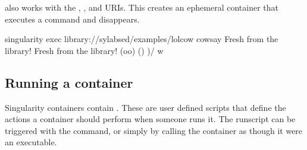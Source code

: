 \documentclass[letterpaper,10pt,english]{sphinxmanual}
\begin{document}
 also works with the , , and 
URIs. This creates an ephemeral container that executes a command and
disappears.

%
\begin{sphinxVerbatim}[commandchars=\\\{\}]
\PYGZdl{} singularity exec library://sylabsed/examples/lolcow cowsay \PYGZdq{}Fresh from the library!\PYGZdq{}
 \PYGZus{}\PYGZus{}\PYGZus{}\PYGZus{}\PYGZus{}\PYGZus{}\PYGZus{}\PYGZus{}\PYGZus{}\PYGZus{}\PYGZus{}\PYGZus{}\PYGZus{}\PYGZus{}\PYGZus{}\PYGZus{}\PYGZus{}\PYGZus{}\PYGZus{}\PYGZus{}\PYGZus{}\PYGZus{}\PYGZus{}\PYGZus{}\PYGZus{}
\PYGZlt{} Fresh from the library! \PYGZgt{}
 \PYGZhy{}\PYGZhy{}\PYGZhy{}\PYGZhy{}\PYGZhy{}\PYGZhy{}\PYGZhy{}\PYGZhy{}\PYGZhy{}\PYGZhy{}\PYGZhy{}\PYGZhy{}\PYGZhy{}\PYGZhy{}\PYGZhy{}\PYGZhy{}\PYGZhy{}\PYGZhy{}\PYGZhy{}\PYGZhy{}\PYGZhy{}\PYGZhy{}\PYGZhy{}\PYGZhy{}\PYGZhy{}
        \PYGZbs{}   \PYGZca{}\PYGZus{}\PYGZus{}\PYGZca{}
         \PYGZbs{}  (oo)\PYGZbs{}\PYGZus{}\PYGZus{}\PYGZus{}\PYGZus{}\PYGZus{}\PYGZus{}\PYGZus{}
            (\PYGZus{}\PYGZus{})\PYGZbs{}       )\PYGZbs{}/\PYGZbs{}
                \textbar{}\textbar{}\PYGZhy{}\PYGZhy{}\PYGZhy{}\PYGZhy{}w \textbar{}
                \textbar{}\textbar{}     \textbar{}\textbar{}
\end{sphinxVerbatim}


\subsection{Running a container}
\label{\detokenize{quick_start:running-a-container}}
Singularity containers contain {\hyperref[\detokenize{definition_files:runscript}]{}}. These are user
defined scripts that define the actions a container should perform when someone
runs it. The runscript can be triggered with the 
command, or simply by  calling the container as though it were an executable.
\end{document}
